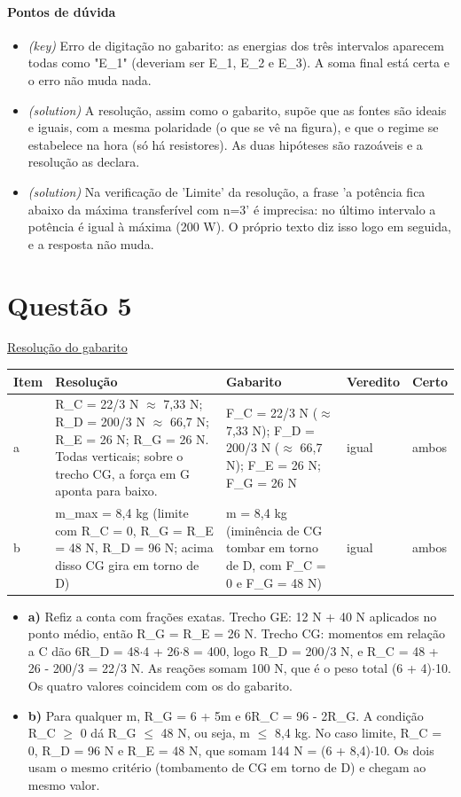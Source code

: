 \documentclass{article}%
\begin{document}
\paragraph{Pontos de dúvida}%
\begin{itemize}%
\item%
\textit{(key)} Erro de digitação no gabarito: as energias dos três intervalos aparecem todas como "E\_1" (deveriam ser E\_1, E\_2 e E\_3). A soma final está certa e o erro não muda nada.%
\item%
\textit{(solution)} A resolução, assim como o gabarito, supõe que as fontes são ideais e iguais, com a mesma polaridade (o que se vê na figura), e que o regime se estabelece na hora (só há resistores). As duas hipóteses são razoáveis e a resolução as declara.%
\item%
\textit{(solution)} Na verificação de 'Limite' da resolução, a frase 'a potência fica abaixo da máxima transferível com n=3' é imprecisa: no último intervalo a potência é igual à máxima (200 W). O próprio texto diz isso logo em seguida, e a resposta não muda.%
\end{itemize}%
\section*{Questão 5}%
\href{https://poliedroresolve.sistemapoliedro.com.br/vestibulares/ime/2026/ime-2-fase-dia-2-24-10-2025-2-fase-dia-2/dissertativa-5-fisica-2-fase-dia-2-ime-2026}{Resolução do gabarito}\par\smallskip%
\begin{longtable}{@{}p{} p{} p{} p{} p{}@{}}\toprule Item & Resolução & Gabarito & Veredito & Certo \\ \midrule
a & R\_C = 22/3 N $\approx$ 7,33 N; R\_D = 200/3 N $\approx$ 66,7 N; R\_E = 26 N; R\_G = 26 N. Todas verticais; sobre o trecho CG, a força em G aponta para baixo. & F\_C = 22/3 N ($\approx$ 7,33 N); F\_D = 200/3 N ($\approx$ 66,7 N); F\_E = 26 N; F\_G = 26 N & igual & ambos \\
b & m\_max = 8,4 kg (limite com R\_C = 0, R\_G = R\_E = 48 N, R\_D = 96 N; acima disso CG gira em torno de D) & m = 8,4 kg (iminência de CG tombar em torno de D, com F\_C = 0 e F\_G = 48 N) & igual & ambos \\
\bottomrule\end{longtable}%
\begin{itemize}%
\item%
\textbf{a)} Refiz a conta com frações exatas. Trecho GE: 12 N + 40 N aplicados no ponto médio, então R\_G = R\_E = 26 N. Trecho CG: momentos em relação a C dão 6R\_D = 48$\cdot$4 + 26$\cdot$8 = 400, logo R\_D = 200/3 N, e R\_C = 48 + 26 - 200/3 = 22/3 N. As reações somam 100 N, que é o peso total (6 + 4)$\cdot$10. Os quatro valores coincidem com os do gabarito.%
\item%
\textbf{b)} Para qualquer m, R\_G = 6 + 5m e 6R\_C = 96 - 2R\_G. A condição R\_C $\geq$ 0 dá R\_G $\leq$ 48 N, ou seja, m $\leq$ 8,4 kg. No caso limite, R\_C = 0, R\_D = 96 N e R\_E = 48 N, que somam 144 N = (6 + 8,4)$\cdot$10. Os dois usam o mesmo critério (tombamento de CG em torno de D) e chegam ao mesmo valor.%
\end{itemize}%
\end{document}
